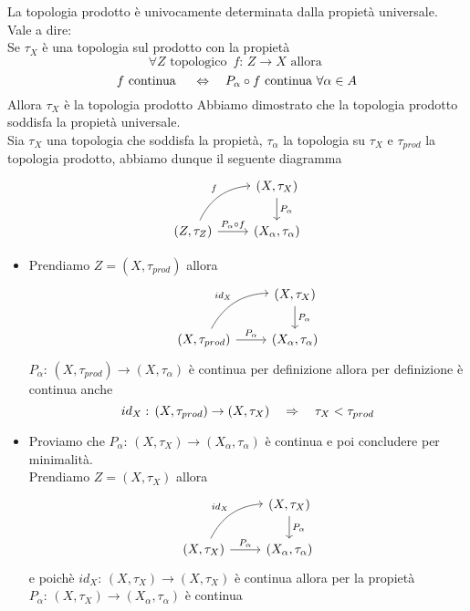 \begin{thm}La topologia prodotto \`e univocamente determinata dalla propiet\`a universale.\\
Vale a dire:\\
Se $\tau_X$ \`e una topologia sul prodotto con la propiet\`a 
$$ \forall Z \text{ topologico } \, f:\, Z \to X \text{ allora } $$
$$ f \text{ continua } \quad \Leftrightarrow \quad P_\alpha \circ f \text{ continua } \forall \alpha\in A  $$
Allora $\tau_X$ \`e la topologia prodotto
\proof Abbiamo dimostrato che la topologia prodotto soddisfa la propiet\`a universale.\\
Sia $\tau_X$ una topologia che soddisfa la propiet\`a, $\tau_\alpha$ la topologia su $\tau_X$ e $\tau_{prod}$ la topologia prodotto, abbiamo dunque il seguente diagramma 
$$\begin{tikzcd} & (X, \tau_X) \arrow{d}{P_\alpha}\\
(Z,\tau_Z) \arrow[bend left]{ur}{f} \arrow{r}{P_\alpha\circ f} &(X_\alpha,\tau_\alpha)
\end{tikzcd}$$
\begin{itemize}
\item Prendiamo $Z=(X, \tau_{prod})$ allora
$$\begin{tikzcd} & (X, \tau_X) \arrow{d}{P_\alpha}\\
(X,\tau_{prod}) \arrow[bend left]{ur}{id_X} \arrow{r}{P_\alpha} &(X_\alpha,\tau_\alpha)
\end{tikzcd}$$
$P_\alpha:\, (X,\tau_{prod})\to (X,\tau_\alpha)$ \`e continua per definizione allora per definizione \`e continua anche 
$$id_X:\, (X,\tau_{prod})\to (X,\tau_X) \quad \Rightarrow \quad \tau_X < \tau_{prod}$$
\item Proviamo che $P_\alpha:\,(X,\tau_X) \to (X_\alpha,\tau_\alpha)$ \`e continua e poi concludere per minimalit\`a.\\
Prendiamo $Z=(X,\tau_X)$  allora 
$$\begin{tikzcd} & (X, \tau_X) \arrow{d}{P_\alpha}\\
(X,\tau_{X}) \arrow[bend left]{ur}{id_X} \arrow{r}{P_\alpha} &(X_\alpha,\tau_\alpha)
\end{tikzcd}$$
e poich\`e $id_X:\, (X, \tau_X)\to (X,\tau_X)$ \`e continua allora per la propiet\`a $P_\alpha:\, (X,\tau_X) \to (X_\alpha, \tau_\alpha)$ 
\`e continua
\end{itemize}
\end{thm}

